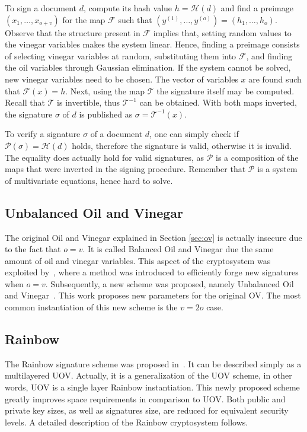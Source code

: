 \documentclass{ufsctex/ufsctex}
\begin{document}
To sign a document $d$, compute its hash value $h = \mathcal{H}(d)$ and find a
preimage $(x_1,\dots,x_{o+v})$ for the map $\mathcal{F}$ such that
$(y^{(1)},\dots,y^{(o)}) = (h_1,\dots,h_o)$. Observe that the structure present
in $\mathcal{F}$ implies that, setting random values to the vinegar variables
makes the system linear. Hence, finding a preimage consists of selecting
vinegar variables at random, substituting them into $\mathcal{F}$, and finding
the oil variables through Gaussian elimination. If the system cannot be solved,
new vinegar variables need to be chosen. The vector of variables $x$ are found
such that $\mathcal{F}(x)=h$. Next, using the map $\mathcal{T}$ the signature
itself may be computed. Recall that $\mathcal{T}$ is invertible, thus
$\mathcal{T}^{-1}$ can be obtained. With both maps inverted, the signature
$\sigma$ of $d$ is published as $\sigma = \mathcal{T}^{-1}(x)$.

To verify a signature $\sigma$ of a document $d$, one can simply check if
$\mathcal{P}(\sigma) = \mathcal{H}(d)$ holds, therefore the signature is valid,
otherwise it is invalid. The equality does actually hold for valid signatures,
as $\mathcal{P}$ is a composition of the maps that were inverted in the signing
procedure. Remember that $\mathcal{P}$ is a system of multivariate equations,
hence hard to solve.

\subsection{Unbalanced Oil and Vinegar}

The original Oil and Vinegar explained in Section \ref{sec:ov} is actually
insecure due to the fact that $o = v$. It is called Balanced Oil and Vinegar
due the same amount of oil and vinegar variables. This aspect of the
cryptosystem was exploited by~\cite{kipnis1998cryptanalysis}, where a method
was introduced to efficiently forge new signatures when $o = v$. Subsequently,
a new scheme was proposed, namely Unbalanced Oil and
Vinegar~\cite{kipnis1999unbalanced}. This work proposes new parameters for the
original OV. The most common instantiation of this new scheme is the $v = 2o$
case.

\subsection{Rainbow}\label{sec:rainbow}

The Rainbow signature scheme was proposed in~\cite{ding2005rainbow}. It can be
described simply as a multilayered UOV. Actually, it is a generalization of the
UOV scheme, in other words, UOV is a single layer Rainbow instantiation. This
newly proposed scheme greatly improves space requirements in comparison to UOV.
Both public and private key sizes, as well as signatures size, are reduced for
equivalent security levels. A detailed description of the Rainbow cryptosystem
follows.
\end{document}
